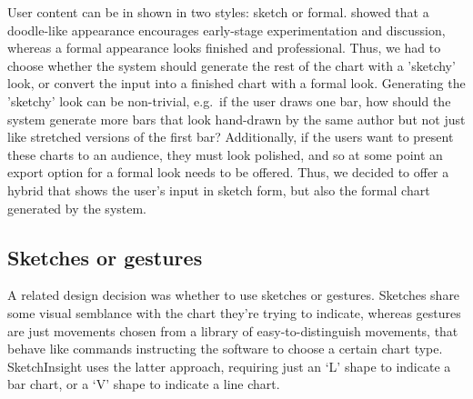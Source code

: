 	User content can be in shown in two styles: sketch or formal. \citep{yeung_effect_2008} showed that a doodle-like appearance encourages early-stage experimentation and discussion, whereas a formal appearance looks finished and professional. Thus, we had to choose whether the system should generate the rest of the chart with a 'sketchy' look, or convert the input into a finished chart with a formal look. Generating the 'sketchy' look can be non-trivial, \citep{plimmer_sketchnode:_2010, wang_sketchset:_2011} e.g.\ if the user draws one bar, how should the system generate more bars that look hand-drawn by the same author but not just like stretched versions of the first bar? Additionally, if the users want to present these charts to an audience, they must look polished, and so at some point an export option for a formal look needs to be offered. Thus, we decided to offer a hybrid that shows the user's input in sketch form, but also the formal chart generated by the system.
	
	
	\subsection{Sketches or gestures}
	A related design decision was whether to use sketches or gestures. Sketches share some visual semblance with the chart they're trying to indicate, whereas gestures are just movements chosen from a library of easy-to-distinguish movements, that behave like commands instructing the software to choose a certain chart type. SketchInsight \citep{walny_understanding_2012} uses the latter approach, requiring just an `L' shape to indicate a bar chart, or a `V' shape to indicate a line chart. 
	
		
